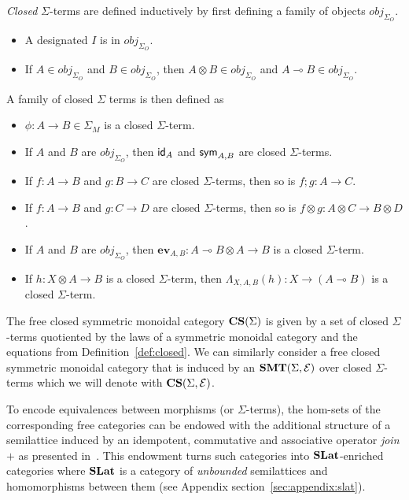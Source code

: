 \begin{definition}
\textit{Closed} $\Sigma$-terms are defined inductively by first defining a family of objects $obj_{\Sigma_{O}}$.
\begin{itemize}
\item A designated $I$ is in $obj_{\Sigma_{O}}$.
\item If $A \in obj_{\Sigma_{O}}$ and $B \in obj_{\Sigma_{O}}$, then $A \otimes B \in obj_{\Sigma_{O}}$ and $A \multimap B \in obj_{\Sigma_{O}}$.
\end{itemize}
A family of closed $\Sigma$ terms is then defined as
\begin{itemize}
    \item $\phi : A \to B \in \Sigma_{M}$ is a closed $\Sigma$-term.
    \item If $A$ and $B$ are $obj_{\Sigma_{O}}$, then $\textsf{id}_{A}$ and $\textsf{sym}_{A,B}$ are closed $\Sigma$-terms.
    \item If $f : A \to B$ and $g : B \to C$ are closed $\Sigma$-terms, then so is $f;g : A \to C$. 
    \item If $f : A \to B$ and $g : C \to D$ are closed $\Sigma$-terms, then so is $f \otimes g : A \otimes C \to B \otimes D$.
    \item If $A$ and $B$ are $obj_{\Sigma_{O}}$, then $\textbf{ev}_{A,B} : A \multimap B \otimes A \to B$ is a closed $\Sigma$-term.
    \item If $h : X \otimes A \to B$ is a closed $\Sigma$-term, then $\Lambda_{X,A,B}(h) : X \to (A \multimap B)$ is a closed $\Sigma$-term.
\end{itemize}
\end{definition}

\begin{definition}
The free closed symmetric monoidal category $\mathbf{CS}(\Sigma)$ is given by a set of closed $\Sigma$-terms quotiented by the laws of a symmetric monoidal category and the equations from Definition~\ref{def:closed}.
We can similarly consider a free closed symmetric monoidal category that is induced by an $\mathbf{SMT}(\Sigma, \mathcal{E})$ over closed $\Sigma$-terms which we will denote with $\mathbf{CS}(\Sigma, \mathcal{E})$.
\end{definition}

To encode equivalences between morphisms (or $\Sigma$-terms), the hom-sets of the corresponding free categories can be endowed with the additional structure of a semilattice induced by an idempotent, commutative and associative operator \textit{join} $+$ as presented in~\cite{ghica2024equivalencehypergraphsegraphsmonoidal}.
This endowment turns such categories into $\mathbf{SLat}$-enriched categories where $\mathbf{SLat}$ is a category of \textit{unbounded} semilattices and homomorphisms between them (see Appendix section~\ref{sec:appendix:slat}).

